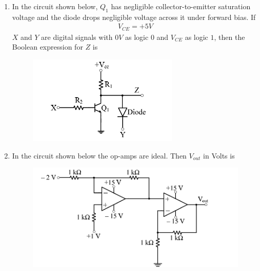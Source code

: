\documentclass[journal,12pt,onecolumn]{IEEEtran}
\theoremstyle{remark}
\begin{document}
\begin{enumerate}
\item In the circuit shown below, $Q_1$ has negligible collector-to-emitter saturation voltage and the diode drops negligible voltage across it under forward bias. If 
\begin{align*}
    V_{CE} = +5V
\end{align*}
$X$ and $Y$ are digital signals with $0V$ as logic $0$ and $V_{CE}$ as logic $1$, then the Boolean expression for $Z$ is
\begin{figure}[h]
    \centering
    \includegraphics[width=0.5\columnwidth]{figs/17.png}
    \label{fig:placeholder}
\end{figure}
\begin{enumerate}
\end{enumerate}

\item In the circuit shown below the op-amps are ideal. Then $V_{out}$ in Volts is
\begin{figure}[h]
    \centering
    \includegraphics[width=0.5\columnwidth]{figs/18.png}
    \label{fig:placeholder}
\end{figure}
\begin{enumerate}
\end{enumerate}



\end{enumerate}
\end{document}

